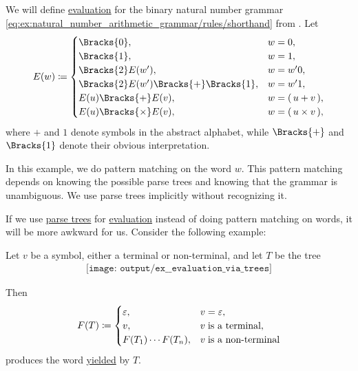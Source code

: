 \begin{example}\label{ex:natural_number_arithmetic_grammar/evaluation}
  We will define \hyperref[rem:evaluation]{evaluation} for the binary natural number grammar \eqref{eq:ex:natural_number_arithmetic_grammar/rules/shorthand} from . Let
  \begin{equation*}
    E(w) \coloneqq \begin{cases}
      \Bracks{0},                    &w = 0, \\
      \Bracks{1},                    &w = 1, \\
      \Bracks{2} E(w'),              &w = w' 0, \\
      \Bracks{2} E(w') \Bracks{+} \Bracks{1}, &w = w' 1, \\
      E(u) \Bracks{+} E(v),          &w = \mathtt{(} \thinspace u + v \thinspace \mathtt{)}, \\
      E(u) \Bracks{\times} E(v),     &w = \mathtt{(} \thinspace u \times v \thinspace \mathtt{)},
    \end{cases}
  \end{equation*}
  where \( + \) and \( 1 \) denote symbols in the abstract alphabet, while \( \Bracks{+} \) and \( \Bracks{1} \) denote their obvious interpretation.

  In this example, we do pattern matching on the word \( w \). This pattern matching depends on knowing the possible parse trees and knowing that the grammar is unambiguous. We use parse trees implicitly without recognizing it.
\end{example}

\begin{example}\label{ex:evaluation_via_trees}
  If we use \hyperref[def:parse_tree]{parse trees} for \hyperref[rem:evaluation]{evaluation} instead of doing pattern matching on words, it will be more awkward for us. Consider the following example:

  Let \( v \) be a symbol, either a terminal or non-terminal, and let \( T \) be the tree
  \begin{equation*}
    \begin{aligned}
      \texttt{[image: output/ex\_\_evaluation\_via\_trees]}
    \end{aligned}
  \end{equation*}

  Then
  \begin{equation*}
    F(T) \coloneqq \begin{cases}
      \varepsilon,          &v = \varepsilon, \\
      v,                    &v \T{is a terminal}, \\
      F(T_1) \cdots F(T_n), &v \T{is a non-terminal}
    \end{cases}
  \end{equation*}
  produces the word \hyperref[def:parse_tree_word]{yielded} by \( T \).
\end{example}

